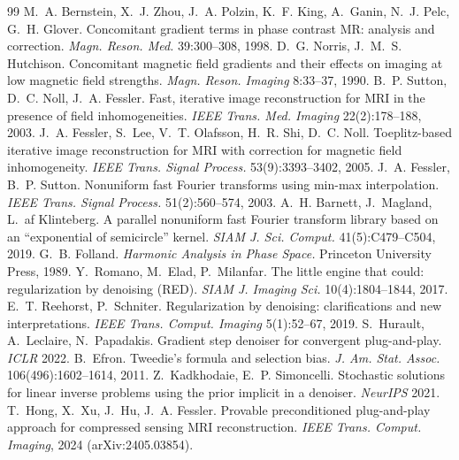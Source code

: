 \documentclass[11pt]{article}
\theoremstyle{remark}
\begin{document}
\begin{thebibliography}{99}
 M.~A. Bernstein, X.~J. Zhou, J.~A. Polzin, K.~F. King, A.~Ganin, N.~J. Pelc, G.~H. Glover. Concomitant gradient terms in phase contrast MR: analysis and correction. \emph{Magn. Reson. Med.} 39:300--308, 1998.
 D.~G. Norris, J.~M.~S. Hutchison. Concomitant magnetic field gradients and their effects on imaging at low magnetic field strengths. \emph{Magn. Reson. Imaging} 8:33--37, 1990.
 B.~P. Sutton, D.~C. Noll, J.~A. Fessler. Fast, iterative image reconstruction for MRI in the presence of field inhomogeneities. \emph{IEEE Trans. Med. Imaging} 22(2):178--188, 2003.
 J.~A. Fessler, S.~Lee, V.~T. Olafsson, H.~R. Shi, D.~C. Noll. Toeplitz-based iterative image reconstruction for MRI with correction for magnetic field inhomogeneity. \emph{IEEE Trans. Signal Process.} 53(9):3393--3402, 2005.
 J.~A. Fessler, B.~P. Sutton. Nonuniform fast Fourier transforms using min-max interpolation. \emph{IEEE Trans. Signal Process.} 51(2):560--574, 2003.
 A.~H. Barnett, J.~Magland, L.~af Klinteberg. A parallel nonuniform fast Fourier transform library based on an ``exponential of semicircle'' kernel. \emph{SIAM J. Sci. Comput.} 41(5):C479--C504, 2019.
 G.~B. Folland. \emph{Harmonic Analysis in Phase Space.} Princeton University Press, 1989.
 Y.~Romano, M.~Elad, P.~Milanfar. The little engine that could: regularization by denoising (RED). \emph{SIAM J. Imaging Sci.} 10(4):1804--1844, 2017.
 E.~T. Reehorst, P.~Schniter. Regularization by denoising: clarifications and new interpretations. \emph{IEEE Trans. Comput. Imaging} 5(1):52--67, 2019.
 S.~Hurault, A.~Leclaire, N.~Papadakis. Gradient step denoiser for convergent plug-and-play. \emph{ICLR} 2022.
 B.~Efron. Tweedie's formula and selection bias. \emph{J. Am. Stat. Assoc.} 106(496):1602--1614, 2011.
 Z.~Kadkhodaie, E.~P. Simoncelli. Stochastic solutions for linear inverse problems using the prior implicit in a denoiser. \emph{NeurIPS} 2021.
 T.~Hong, X.~Xu, J.~Hu, J.~A. Fessler. Provable preconditioned plug-and-play approach for compressed sensing MRI reconstruction. \emph{IEEE Trans. Comput. Imaging}, 2024 (arXiv:2405.03854).
\end{thebibliography}
\end{document}
